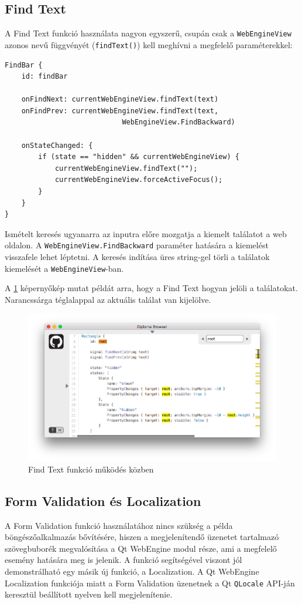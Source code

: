 \documentclass[12pt]{report}
\begin{document}
\subsection{Find Text}

A Find Text funkció használata nagyon egyszerű, csupán csak a \texttt{WebEngineView} azonos
nevű függvényét (\texttt{findText()}) kell meghívni a megfelelő paraméterekkel:
\begin{lstlisting}[title=main.qml]
FindBar {
    id: findBar

    onFindNext: currentWebEngineView.findText(text)
    onFindPrev: currentWebEngineView.findText(text,
                            WebEngineView.FindBackward)

    onStateChanged: {
        if (state == "hidden" && currentWebEngineView) {
            currentWebEngineView.findText("");
            currentWebEngineView.forceActiveFocus();
        }
    }
}
\end{lstlisting}
Ismételt keresés ugyanarra az inputra előre mozgatja a kiemelt találatot a web oldalon. A
\texttt{WebEngineView.FindBackward} paraméter hatására a kiemelést visszafele lehet léptetni.
A keresés indítása üres string-gel törli a találatok kiemelését a \texttt{WebEngineView}-ban.

A \ref{fig:find-bar-screen} képernyőkép mutat példát arra, hogy a Find Text hogyan jelöli
a találatokat. Narancssárga téglalappal az aktuális találat van kijelölve.

\begin{figure}[ht]
    \centering
    \includegraphics[scale=0.5]{FindBar-screen}
    \caption{
        \label{fig:find-bar-screen}
        Find Text funkció működés közben
    }
\end{figure}

\newpage
\subsection{Form Validation és Localization}
A Form Validation funkció használatához nincs szükség a példa böngészőalkalmazás bővítésére,
hiszen a megjelenítendő üzenetet tartalmazó szövegbuborék megvalósítása a Qt WebEngine modul
része, ami a megfelelő esemény hatására meg is jelenik. A funkció segítségével viszont jól
demonstrálható egy másik új funkció, a Localization. A Qt WebEngine Localization funkciója
miatt a Form Validation üzenetnek a Qt \texttt{QLocale} API-ján keresztül beállított nyelven
kell megjelenítenie.
\end{document}
